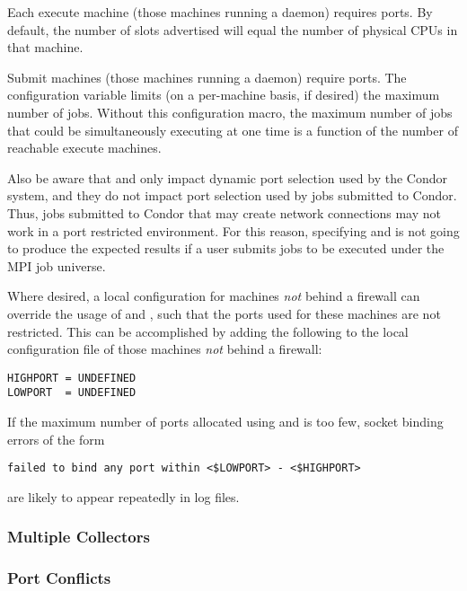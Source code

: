 Each execute machine (those machines running a  daemon)
requires
ports.
By default, the number of slots advertised
will equal the number of physical CPUs in that machine.

Submit machines (those machines running a  daemon)
require
 ports.
The configuration variable 
limits (on a per-machine basis, if desired)
the maximum number of jobs.
Without this configuration macro,
the maximum number of jobs that could be simultaneously
executing at one time
is a function of the number of reachable execute machines. 

Also be aware that  and 
only impact dynamic port selection used by the Condor system,
and they do not impact port selection used by jobs submitted to Condor.
Thus, jobs submitted to Condor that may create
network connections may not work in a port restricted environment.
For this reason, specifying  and 
is not going to produce the
expected results if a user submits jobs to be executed under
the MPI job universe.

Where desired, a local
configuration for machines \emph{not} behind a firewall
can override the usage of  and ,
such that the ports used for these machines are not restricted.
This can be accomplished by adding the following to the
local configuration file of those machines \emph{not}
behind a firewall:
\begin{verbatim}
HIGHPORT = UNDEFINED
LOWPORT  = UNDEFINED
\end{verbatim}


If the maximum number of ports allocated using 
 and 
is too few,
socket binding errors of the form
\footnotesize
\begin{verbatim}
failed to bind any port within <$LOWPORT> - <$HIGHPORT>
\end{verbatim}
\normalsize
are likely to appear repeatedly in log files.


\subsubsection{\label{sec:Ports-MultipleCollectors}Multiple Collectors}
\Todo


\subsubsection{\label{sec:Ports-Conflicts}Port Conflicts}
\Todo

